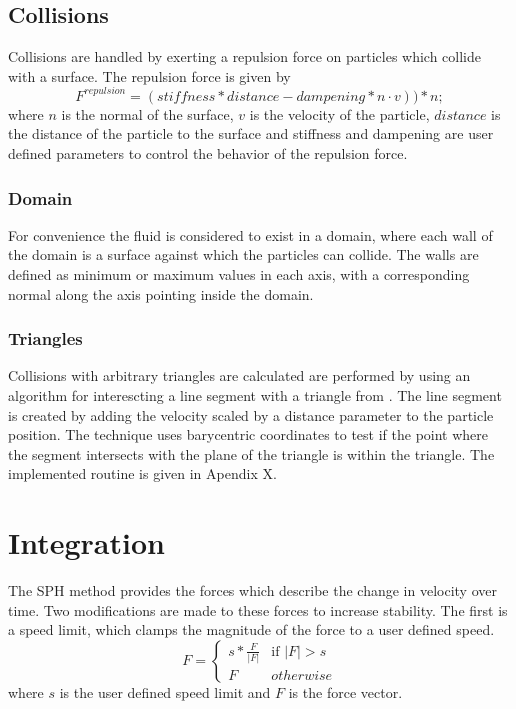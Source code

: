 \subsection{Collisions}

Collisions are handled by exerting a repulsion force on particles which collide
with a surface. The repulsion force is given by
$$
F^{repulsion} = (stiffness * distance - dampening * n \cdot v))*n;
$$
where $n$ is the normal of the surface, $v$ is the velocity of the particle,
$distance$ is the distance of the particle to the surface and
stiffness and dampening are user defined parameters to control the behavior of
the repulsion force.\cite{Krog}

\subsubsection{Domain}
For convenience the fluid is considered to exist in a domain, where each wall
of the domain is a surface against which the particles can collide. The walls
are defined as minimum or maximum values in each axis, with a corresponding
normal along the axis pointing inside the domain. 

\subsubsection{Triangles}

Collisions with arbitrary triangles are calculated are performed by using an
algorithm for interescting a line segment with a triangle from \cite{Ericson}. The line segment is
created by adding the velocity scaled by a distance parameter to the particle
position. The technique uses barycentric coordinates to test if the point where
the segment intersects with the plane of the triangle is within the triangle.
The implemented routine is given in Apendix X.



\section{Integration}

The SPH method provides the forces which describe the change in velocity over
time. Two modifications are made to these forces to increase stability. The
first is a speed limit, which clamps the magnitude of the force to a user defined speed.
$$
F = \begin{cases} s * \frac{F}{|F|} & \text{if $|F| > s$}
    \\
    F & \text{$otherwise$}
\end{cases}
$$
where $s$ is the user defined speed limit and $F$ is the force vector.

